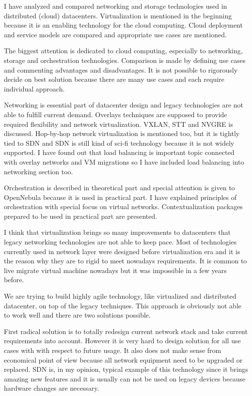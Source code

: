 
I have analyzed and compared networking and storage technologies used in distributed (cloud) datacenters. Virtualization is mentioned in the beginning because it is an enabling technology for the cloud computing. Cloud deployment and service models are compared and appropriate use cases are mentioned.

The biggest attention is dedicated to cloud computing, especially to networking, storage and orchestration technologies. Comparison is made by defining use cases and commenting advantages and disadvantages. It is not possible to rigorously decide on best solution because there are many use cases and each require individual approach.

Networking is essential part of datacenter design and legacy technologies are not able to fulfill current demand. Overlays techniques are supposed to provide required flexibility and network virtualization. \Ac{VXLAN}, \Ac{STT} and \Ac{NVGRE} is discussed. Hop-by-hop network virtualization is mentioned too, but it is tightly tied to \Ac{SDN} and \Ac{SDN} is still kind of sci-fi technology because it is not widely supported.  
I have found out that load balancing is important topic connected with overlay networks and \Ac{VM} migrations so I have included load balancing into networking section too.


Orchestration is described in theoretical part and special attention is given to OpenNebula because it is used in practical part. I have explained principles of orchestration with special focus on virtual networks. Contextualization packages prepared to be used in practical part are presented.

I think that virtualization brings so many improvements to datacenters that legacy networking technologies are not able to keep pace. Most of technologies currently used in network layer were designed before virtualization era and it is the reason why they are to rigid to meet nowadays requirements. It is common to live migrate virtual machine nowadays but it was impossible in a few years before.

We are trying to build highly agile technology, like virtualized and distributed datacenter, on top of the legacy techniques. This approach is obviously not able to work well and there are two solutions possible. 

First radical solution is to totally redesign current network stack and take current requirements into account. However it is very hard to design solution for all use cases with with respect to future usage. It also does not make sense from economical point of view because all network equipment need to be upgraded or replaced. \Ac{SDN} is, in my opinion, typical example of this technology since it brings amazing new features and it is usually can not be used on legacy devices because hardware changes are necessary.

